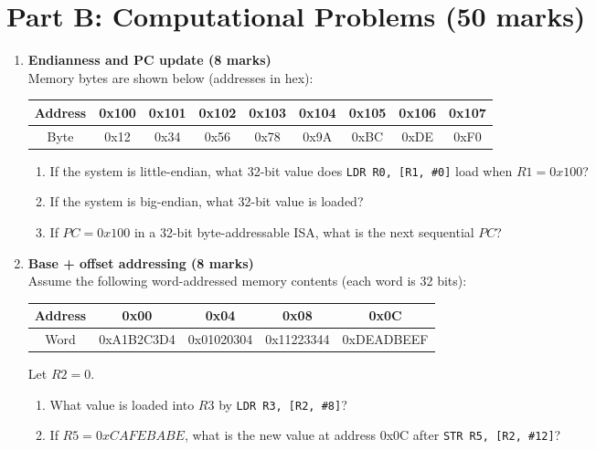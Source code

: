 \documentclass[11pt]{article}
\begin{document}
\section*{Part B: Computational Problems (50 marks)}
\begin{enumerate}[label=\textbf{B\arabic*.}]
  \item \textbf{Endianness and PC update (8 marks)}\\
  Memory bytes are shown below (addresses in hex):
  \begin{center}
  \begin{tabular}{c|cccccccc}
  Address & 0x100 & 0x101 & 0x102 & 0x103 & 0x104 & 0x105 & 0x106 & 0x107 \\ \hline
  Byte    & 0x12  & 0x34  & 0x56  & 0x78  & 0x9A  & 0xBC  & 0xDE  & 0xF0 \\
  \end{tabular}
  \end{center}
  \begin{enumerate}[label=(\alph*)]
    \item If the system is little-endian, what 32-bit value does \texttt{LDR R0, [R1, \#0]} load when $R1=0x100$?
    \item If the system is big-endian, what 32-bit value is loaded?
    \item If $PC=0x100$ in a 32-bit byte-addressable ISA, what is the next sequential $PC$?
  \end{enumerate}

  \item \textbf{Base + offset addressing (8 marks)}\\
  Assume the following word-addressed memory contents (each word is 32 bits):
  \begin{center}
  \begin{tabular}{c|cccc}
  Address & 0x00 & 0x04 & 0x08 & 0x0C \\ \hline
  Word    & 0xA1B2C3D4 & 0x01020304 & 0x11223344 & 0xDEADBEEF \\
  \end{tabular}
  \end{center}
  Let $R2=0$.
  \begin{enumerate}[label=(\alph*)]
    \item What value is loaded into $R3$ by \texttt{LDR R3, [R2, \#8]}?
    \item If $R5=0xCAFEBABE$, what is the new value at address 0x0C after \texttt{STR R5, [R2, \#12]}?
  \end{enumerate}


\end{enumerate}
\end{document}
